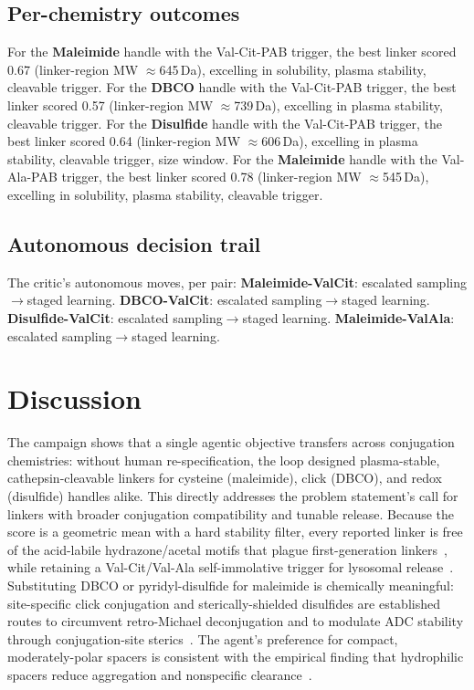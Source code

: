 \documentclass[10pt]{article}
\begin{document}
\subsection{Per-chemistry outcomes}
For the \textbf{Maleimide} handle with the Val-Cit-PAB trigger, the best linker scored 0.67 (linker-region MW $\approx$645\,Da), excelling in solubility, plasma stability, cleavable trigger. For the \textbf{DBCO} handle with the Val-Cit-PAB trigger, the best linker scored 0.57 (linker-region MW $\approx$739\,Da), excelling in plasma stability, cleavable trigger. For the \textbf{Disulfide} handle with the Val-Cit-PAB trigger, the best linker scored 0.64 (linker-region MW $\approx$606\,Da), excelling in plasma stability, cleavable trigger, size window. For the \textbf{Maleimide} handle with the Val-Ala-PAB trigger, the best linker scored 0.78 (linker-region MW $\approx$545\,Da), excelling in solubility, plasma stability, cleavable trigger.
\subsection{Autonomous decision trail}
The critic's autonomous moves, per pair: \textbf{Maleimide-ValCit}: escalated sampling$\to$staged learning. \textbf{DBCO-ValCit}: escalated sampling$\to$staged learning. \textbf{Disulfide-ValCit}: escalated sampling$\to$staged learning. \textbf{Maleimide-ValAla}: escalated sampling$\to$staged learning.
\section{Discussion}
The campaign shows that a single agentic objective transfers across conjugation chemistries: without human re-specification, the loop designed plasma-stable, cathepsin-cleavable linkers for cysteine (maleimide), click (DBCO), and redox (disulfide) handles alike. This directly addresses the problem statement's call for linkers with broader conjugation compatibility and tunable release. Because the score is a geometric mean with a hard stability filter, every reported linker is free of the acid-labile hydrazone/acetal motifs that plague first-generation linkers~\cite{peng2021}, while retaining a Val-Cit/Val-Ala self-immolative trigger for lysosomal release~\cite{balamkundu2023}.
Substituting DBCO or pyridyl-disulfide for maleimide is chemically meaningful: site-specific click conjugation and sterically-shielded disulfides are established routes to circumvent retro-Michael deconjugation and to modulate ADC stability through conjugation-site sterics~\cite{su2021,su2021zhang}. The agent's preference for compact, moderately-polar spacers is consistent with the empirical finding that hydrophilic spacers reduce aggregation and nonspecific clearance~\cite{su2021}.
\end{document}

